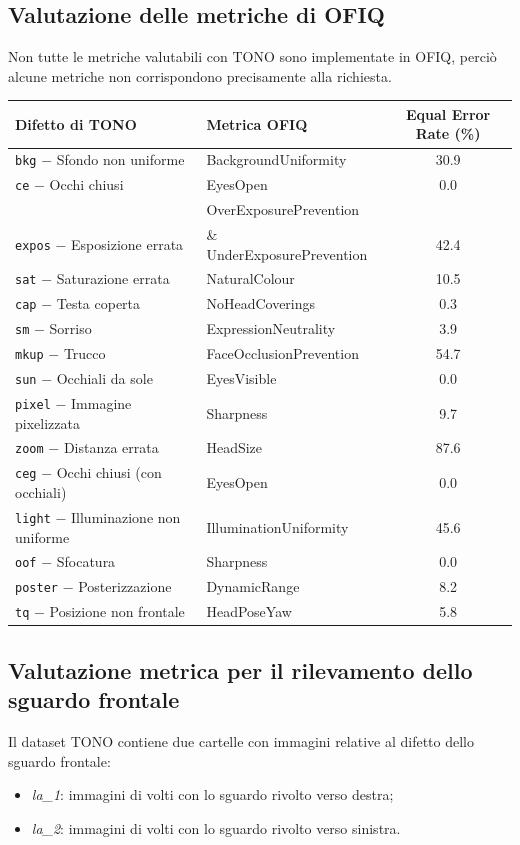 \documentclass[12pt,a4paper,openright,twoside]{book}
\begin{document}
\subsection{Valutazione delle metriche di OFIQ}
Non tutte le metriche valutabili con TONO sono implementate in OFIQ, perciò alcune metriche non corrispondono precisamente alla richiesta.
\medskip

\begin{tabular}{llc}
\toprule
Difetto di TONO & Metrica OFIQ & Equal Error Rate (\%) \\
\midrule
\texttt{bkg} $-$ Sfondo non uniforme & BackgroundUniformity & 30.9 \\
\texttt{ce} $-$ Occhi chiusi & EyesOpen & 0.0 \\
 & OverExposurePrevention \\ \texttt{expos} $-$ Esposizione errata & \& UnderExposurePrevention & 42.4 \\
\texttt{sat} $-$ Saturazione errata & NaturalColour & 10.5 \\
\texttt{cap} $-$ Testa coperta & NoHeadCoverings & 0.3 \\
\texttt{sm} $-$ Sorriso & ExpressionNeutrality & 3.9 \\
\texttt{mkup} $-$ Trucco & FaceOcclusionPrevention & 54.7 \\
\texttt{sun} $-$ Occhiali da sole & EyesVisible & 0.0 \\
\texttt{pixel} $-$ Immagine pixelizzata & Sharpness & 9.7 \\
\texttt{zoom} $-$ Distanza errata & HeadSize & 87.6 \\
\texttt{ceg} $-$ Occhi chiusi (con occhiali) & EyesOpen & 0.0 \\
\texttt{light} $-$ Illuminazione non uniforme & IlluminationUniformity & 45.6 \\
\texttt{oof} $-$ Sfocatura & Sharpness & 0.0 \\
\texttt{poster} $-$ Posterizzazione & DynamicRange & 8.2 \\
\texttt{tq} $-$ Posizione non frontale & HeadPoseYaw & 5.8 \\
\bottomrule
\end{tabular}

\subsection{Valutazione metrica per il rilevamento dello sguardo frontale}
\label{chap:evalutazione_frontal_gaze}
Il dataset TONO contiene due cartelle con immagini relative al difetto dello sguardo frontale:
\begin{itemize}
    \item \textit{la\_1}: immagini di volti con lo sguardo rivolto verso destra;
    \item \textit{la\_2}: immagini di volti con lo sguardo rivolto verso sinistra.
\end{itemize}
\end{document}
